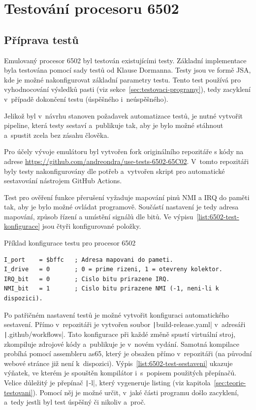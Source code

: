 \section{Testování procesoru 6502}
\subsection{Příprava testů}
Emulovaný procesor 6502 byl testován existujícími testy. Základní implementace byla testována pomocí sady testů od Klause Dormanna. Testy jsou ve formě JSA, kde je možné nakonfigurovat základní parametry testu. Tento test používá pro vyhodnocování výsledků pasti (viz sekce~\ref{sec:testovaci-programy}), tedy zacyklení v~případě dokončení testu (úspěšného i~neúspěšného).

Jelikož byl v~návrhu stanoven požadavek automatizace testů, je nutné vytvořit pipeline, která testy sestaví a~publikuje tak, aby je bylo možné stáhnout a~spustit zcela bez zásahu člověka.

Pro účely vývoje emulátoru byl vytvořen fork originálního repozitáře s kódy na adrese \url{https://github.com/andreondra/use-tests-6502-65C02}. V~tomto repozitáři byly testy nakonfigurovány dle potřeb a~vytvořen skript pro automatické sestavování nástrojem GitHub Actions.

Test pro ověření funkce přerušení vyžaduje mapování pinů NMI a IRQ do paměti tak, aby je bylo možné ovládat programově. Součástí nastavení je tedy adresa mapování, způsob řízení a umístění signálů dle bitů. Ve výpisu~\ref{list:6502-test-konfigurace} jsou čtyři konfigurované položky.

\begin{listing}
	\caption{Příklad konfigurace testu pro procesor 6502}
	\label{list:6502-test-konfigurace}
	\begin{verbatim}
I_port    = $bffc   ; Adresa mapovani do pameti.
I_drive   = 0       ; 0 = prime rizeni, 1 = otevreny kolektor.
IRQ_bit   = 0       ; Cislo bitu prirazene IRQ.
NMI_bit   = 1       ; Cislo bitu prirazene NMI (-1, neni-li k dispozici).
	\end{verbatim}
\end{listing}

Po patřičném nastavení testů je možné vytvořit konfiguraci automatického sestavení. Přímo v~repozitáři je vytvořen soubor \texttt|build-release.yaml| v~adresáři \texttt|.github/workflows|. Tato konfigurace při každé změně spustí virtuální stroj, zkompiluje zdrojové kódy a~publikuje je v~novém vydání. Samotná kompilace probíhá pomocí assembleru as65, který je obsažen přímo v~repozitáři (na původní webové stránce již není k~dispozici). Výpis~\ref{list:6502-test-sestaveni} ukazuje výňatek, ve kterém je spouštěn kompilátor i~s~popisem použitých přepínačů. Velice důležitý je přepínač \texttt|-l|, který vygeneruje listing (viz kapitola~\ref{sec:teorie-testovani}). Pomocí něj je možné určit, v~jaké části programu došlo zacyklení, a~tedy jestli byl test úspěšný či nikoliv a~proč.

